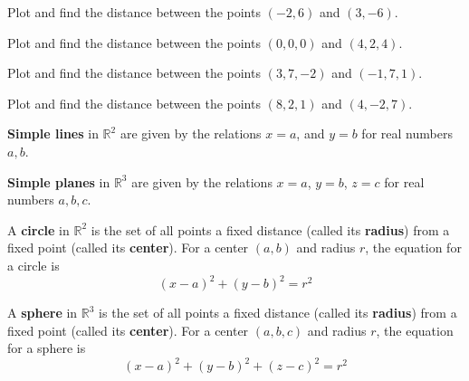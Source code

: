 \documentclass[letterpaper, twoside, 12pt]{book}
\begin{document}
          \begin{problem}
            Plot and find the distance between the points
            $(-2,6)$ and $(3,-6)$.
          \end{problem}

          \begin{solution}

          \end{solution}

          \begin{problem}
            Plot and find the distance between the points
            $(0,0,0)$ and $(4,2,4)$.
          \end{problem}

          \begin{solution}

          \end{solution}

          \begin{problem}
            Plot and find the distance between the points
            $(3,7,-2)$ and $(-1,7,1)$.
          \end{problem}

          \begin{solution}

          \end{solution}

          \begin{problem}
            Plot and find the distance between the points
            $(8,2,1)$ and $(4,-2,7)$.
          \end{problem}

          \begin{solution}

          \end{solution}





\begin{definition}
  \textbf{Simple lines} in $\mathbb{R}^2$ are given by the relations $x=a$,
  and $y=b$ for real numbers $a,b$.

  \textbf{Simple planes} in $\mathbb{R}^3$ are given by the relations $x=a$,
  $y=b$, $z=c$ for real numbers $a,b,c$.
\end{definition}

\begin{definition}
  A \textbf{circle} in $\mathbb{R}^2$ is the set of all points a fixed distance
  (called its \textbf{radius}) from a fixed point (called its \textbf{center}).
  For a center $(a,b)$ and radius $r$, the equation for a circle is
  \[
    (x-a)^2+(y-b)^2=r^2
  \]

  A \textbf{sphere} in $\mathbb{R}^3$ is the set of all points a fixed distance
  (called its \textbf{radius}) from a fixed point (called its \textbf{center}).
  For a center $(a,b,c)$ and radius $r$, the equation for a sphere is
  \[
    (x-a)^2+(y-b)^2+(z-c)^2=r^2
  \]
\end{definition}
\end{document}

